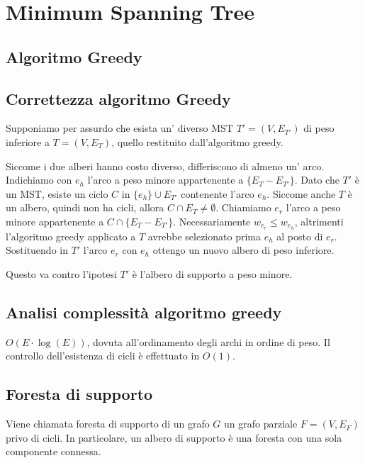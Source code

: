 \documentclass[../template]{subfiles}
\begin{document}
\section{Minimum Spanning Tree}

\begin{center}
\end{center}
\subsection{Algoritmo Greedy}

\subsection{Correttezza algoritmo Greedy}
Supponiamo per assurdo che esista un' diverso MST $T' = (V,E_{T'})$ di peso inferiore a $T = (V, E_T)$,
quello restituito dall'algoritmo greedy.

Siccome i due alberi hanno costo diverso, differiscono di almeno un' arco.
Indichiamo con $e_h$ l'arco a peso minore appartenente a $\{E_T - E_{T'}\}$.
Dato che $T'$ è un MST, esiste un ciclo $C$ in $\{e_h\} \cup E_{T'}$ contenente l'arco $e_h$.
Siccome anche $T$ è un albero, quindi non ha cicli, allora $C \cap E_{T} \neq \emptyset$.
Chiamiamo $e_r$ l'arco a peso minore appartenente a $C \cap \{E_{T} - E_{T'}\}$.
Necessariamente $w_{e_r} \le w_{e_h}$, altrimenti l'algoritmo greedy applicato a $T$ avrebbe selezionato prima $e_h$ al posto di $e_r$.
Sostituendo in $T'$ l'arco $e_r$ con $e_h$ ottengo un nuovo albero di peso inferiore.

Questo va contro l'ipotesi $T'$ è l'albero di supporto a peso minore.
\subsection{Analisi complessità algoritmo greedy}
$O(E \cdot \log (E))$, dovuta all'ordinamento degli archi in ordine di peso.
Il controllo dell'esistenza di cicli è effettuato in $O(1)$.

\subsection{Foresta di supporto}
Viene chiamata foresta di supporto di un grafo $G$ un grafo parziale $F = (V, E_F)$ privo di cicli. In particolare, un albero di
supporto è una foresta con una sola componente connessa.
\end{document}
